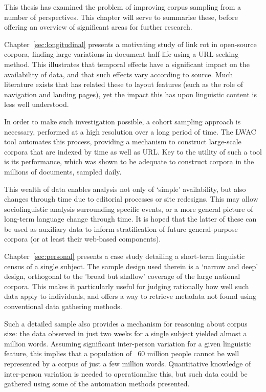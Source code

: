 

This thesis has examined the problem of improving corpus sampling from a number of perspectives.  This chapter will serve to summarise these, before offering an overview of significant areas for further research.

Chapter~\ref{sec:longitudinal} presents a motivating study of link rot in open-source corpora, finding large variations in document half-life using a URL-seeking method.  This illustrates that temporal effects have a significant impact on the availability of data, and that such effects vary according to source.  Much literature exists that has related these to layout features (such as the role of navigation and landing pages), yet the impact this has upon linguistic content is less well understood.

In order to make such investigation possible, a cohort sampling approach is necessary, performed at a high resolution over a long period of time.  The LWAC tool automates this process, providing a mechanism to construct large-scale corpora that are indexed by time as well as URL.  Key to the utility of such a tool is its performance, which was shown to be adequate to construct corpora in the millions of documents, sampled daily.

This wealth of data enables analysis not only of `simple' availability, but also changes through time due to editorial processes or site redesigns.  This may allow sociolinguistic analysis surrounding specific events, or a more general picture of long-term language change through time.  It is hoped that the latter of these can be used as auxiliary data to inform stratification of future general-purpose corpora (or at least their web-based components).

Chapter~\ref{sec:personal} presents a case study detailing a short-term linguistic census of a single subject.  The sample design used therein is a `narrow and deep' design, orthogonal to the 'broad but shallow' coverage of the large national corpora.  This makes it particularly useful for judging rationally how well such data apply to individuals, and offers a way to retrieve metadata not found using conventional data gathering methods.

Such a detailed sample also provides a mechanism for reasoning about corpus size: the data observed in just two weeks for a single subject yielded almost a million words.  Assuming significant inter-person variation for a given linguistic feature, this implies that a population of ~60 million people cannot be well represented by a corpus of just a few million words.  Quantitative knowledge of inter-person variation is needed to operationalise this, but such data could be gathered using some of the automation methods presented.

